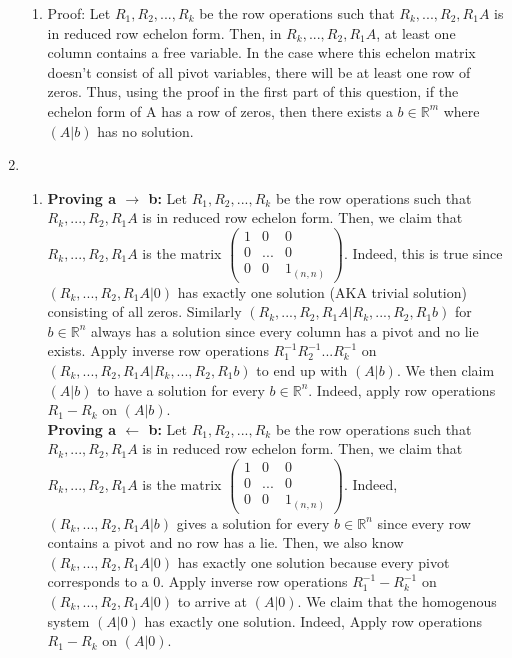 \documentclass{article}
\begin{document}
\begin{enumerate}
\begin{enumerate}
\item Proof:  Let $R_1, R_2, ..., R_k$ be the row operations such that $R_k, ..., R_2, R_1 A$ is in reduced row echelon form. Then, in  $R_k, ..., R_2, R_1 A$, at least one column contains a free variable. In the case where this echelon matrix doesn't consist of all pivot variables, there will be at least one row of zeros. Thus, using the proof in the first part of this question, if the echelon form of A has a row of zeros, then there exists a $b \in \mathbb{R}^m$ where $(A|b)$ has no solution.

\end{enumerate}

\item

\begin{enumerate}

\item \textbf{Proving a $\xrightarrow{}$ b:} Let $R_1, R_2, ..., R_k$ be the row operations such that $R_k, ..., R_2, R_1 A$ is in reduced row echelon form. Then, we claim that $R_k, ..., R_2, R_1 A$ is the matrix $\left(\begin{array}{ccc} 1 & 0 & 0 \\ 0 & ... & 0 \\ 0 & 0 & 1_{(n,n)} \end{array}\right)$. Indeed, this is true since $(R_k, ..., R_2, R_1 A | 0)$ has exactly one solution (AKA trivial solution) consisting of all zeros. Similarly $(R_k, ..., R_2, R_1 A | R_k, ..., R_2, R_1 b)$ for $b \in \mathbb{R}^n$ always has a solution since every column has a pivot and no lie exists. Apply inverse row operations $R_1^{-1} R_2^{-1} ... R_k^{-1} $ on $(R_k, ..., R_2, R_1 A | R_k, ..., R_2, R_1 b)$ to end up with $(A|b)$. We then claim $(A | b)$ to have a solution for every $b \in \mathbb{R}^n$. Indeed, apply row operations $R_1 - R_k$ on $(A | b)$. \\
\textbf{Proving a $\xleftarrow{}$ b:} Let $R_1, R_2, ..., R_k$ be the row operations such that $R_k, ..., R_2, R_1 A$ is in reduced row echelon form. Then, we claim that $R_k, ..., R_2, R_1 A$ is the matrix $\left(\begin{array}{ccc} 1 & 0 & 0 \\ 0 & ... & 0 \\ 0 & 0 & 1_{(n,n)} \end{array}\right)$. Indeed, $(R_k, ..., R_2, R_1 A | b)$ gives a solution for every $b \in \mathbb{R}^n$ since every row contains a pivot and no row has a lie. Then, we also know $(R_k, ..., R_2, R_1 A | 0)$ has exactly one solution because every pivot corresponds to a 0. Apply inverse row operations $R_1^{-1} - R_k^{-1}$ on $(R_k, ..., R_2, R_1 A | 0)$ to arrive at $(A|0)$. We claim that the homogenous system $(A|0)$ has exactly one solution. Indeed, Apply row operations $R_1 - R_k$ on $(A|0)$.


\end{enumerate}
\end{enumerate}
\end{document}
